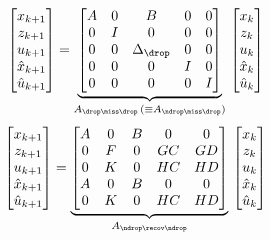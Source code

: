 %
\begin{equation}
    \begin{bmatrix}
        x_{k+1} \\
        z_{k+1} \\
        u_{k+1} \\
        \hat x_{k+1} \\
        \hat u_{k+1}
    \end{bmatrix} = \underbrace{\begin{bmatrix}
        A & 0 & B & 0 & 0 \\
        0 & I & 0 & 0 & 0 \\
        0 & 0 & \Delta_\drop & 0 & 0 \\
        0 & 0 & 0 & I & 0 \\
        0 & 0 & 0 & 0 & I \\
    \end{bmatrix}}_{A_{\drop\miss\drop}\, (\equiv A_{\ndrop\miss\drop})}\, \begin{bmatrix}
        x_{k} \\
        z_{k} \\
        u_{k} \\
        \hat x_{k} \\
        \hat u_{k}
    \end{bmatrix}
\end{equation}
%
\begin{equation}
    \begin{bmatrix}
        x_{k+1} \\
        z_{k+1} \\
        u_{k+1} \\
        \hat x_{k+1} \\
        \hat u_{k+1}
    \end{bmatrix} = \underbrace{\begin{bmatrix}
        A & 0 & B & 0 & 0 \\
        0 & F & 0 & GC & GD \\
        0 & K & 0 & HC & HD \\
        A & 0 & B & 0 & 0 \\
        0 & K & 0 & HC & HD \\
    \end{bmatrix}}_{A_{\ndrop\recov\ndrop}}\, \begin{bmatrix}
        x_{k} \\
        z_{k} \\
        u_{k} \\
        \hat x_{k} \\
        \hat u_{k}
    \end{bmatrix}
\end{equation}
